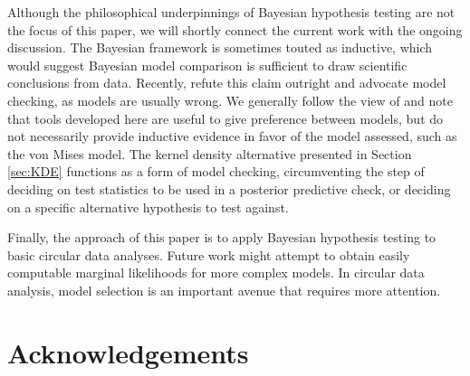 Although the philosophical underpinnings of Bayesian hypothesis testing are not the focus of this paper, we will shortly connect the current work with the ongoing discussion. The Bayesian framework is sometimes touted as inductive, which would suggest Bayesian model comparison is sufficient to draw scientific conclusions from data. Recently, \citet{gelman2013philosophy} refute this claim outright and advocate model checking, as models are usually wrong. We generally follow the view of \citet{morey2013humble} and note that tools developed here are useful to give preference between models, but do not necessarily provide inductive evidence in favor of the model assessed, such as the von Mises model. The kernel density alternative presented in Section \ref{sec:KDE} functions as a form of model checking, circumventing the step of deciding on test statistics to be used in a posterior predictive check, or deciding on a specific alternative hypothesis to test against.

Finally, the approach of this paper is to apply Bayesian hypothesis testing to basic circular data analyses. Future work might attempt to obtain easily computable marginal likelihoods for more complex models. In circular data analysis, model selection is an important avenue that requires more attention. 

\section{Acknowledgements}




